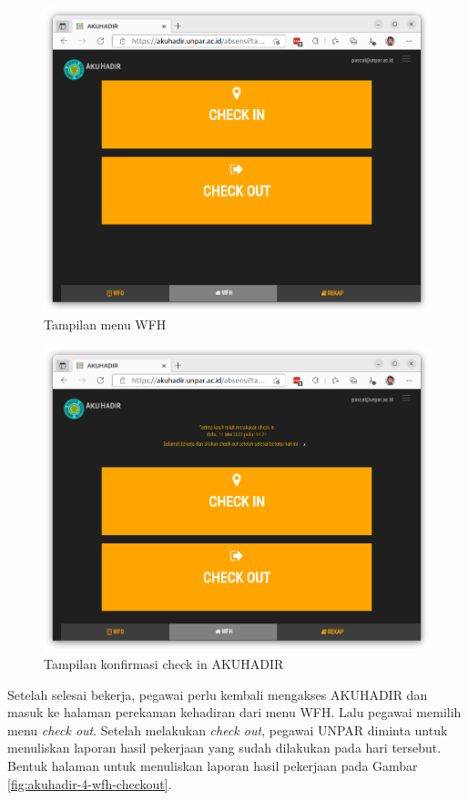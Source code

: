 \begin{figure}[H]
	\centering
	\includegraphics[scale=0.3]{Gambar/akuhadir-2-wfh.png}
	\caption{Tampilan menu WFH} 
	\label{fig:akuhadir-2-wfh}
\end{figure}

\begin{figure}[H]
	\centering
	\includegraphics[scale=0.3]{Gambar/akuhadir-3-wfh-checkin.png}
	\caption{Tampilan konfirmasi check in AKUHADIR} 
	\label{fig:akuhadir-3-wfh-checkin}
\end{figure}

Setelah selesai bekerja, pegawai perlu kembali mengakses AKUHADIR dan masuk ke halaman perekaman kehadiran dari menu WFH. Lalu pegawai memilih menu \textit{check out}. Setelah melakukan \textit{check out}, pegawai UNPAR diminta untuk menuliskan laporan hasil pekerjaan yang sudah dilakukan pada hari tersebut. Bentuk halaman untuk menuliskan laporan hasil pekerjaan pada Gambar \ref{fig:akuhadir-4-wfh-checkout}.

